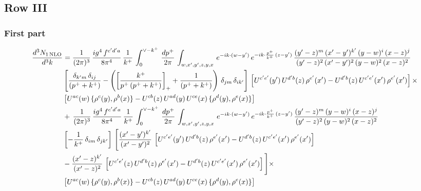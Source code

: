 \documentclass[9pt]{article}
\numberwithin{equation}{section}
\begin{document}
 \subsection{Row III}
\subsubsection{First part}
\begin{align}
\frac{d^{3}N_{1\,\rm NLO}}{d^{3}k} & = \frac{1}{(2\pi)^{3}}\, \frac{ig^{4}\,f^{c'd'a}}{8\pi^{4}}\, \frac{1}{k^{+}}\,\int_{0}^{\vee - k^{+}}\,  \frac{dp^{+}}{2\pi}\, \int_{w,x',y',z,y,x}\, e^{-ik\cdot (w-y')}\, e^{-ik\cdot \frac{p^{+}}{k^{+}}\,(z-y')}\,\frac{(y'-z)^{m}\,(x'-y')^{k'}\,(y-w)^{i}\,(x-z)^{j}}{(y'-z)^{2}\,(x'-y')^{2}\,(y-w)^{2}\,(x-z)^{2}}\notag \\ & \left[\frac{\delta_{k'm}\,\delta_{ij}}{(p^{+}+k^{+})}-\left(\left[\frac{k^{+}}{p^{+}\,(p^{+}+k^{+})}\right]_{+}+\frac{1}{(p^{+}+k^{+})}\right)\,\delta_{jm}\,\delta_{ik'}\right]\, \left[U^{c'e'}(y')\,U^{d'b}(z)\,\rho^{e'}(x')-U^{d'b}(z)\,U^{c'e'}(x')\,\rho^{e'}(x')\right]\times\notag \\ & \left[U^{ac}(w)\, \{\rho^{c}(y),\rho^{b}(x)\}-U^{cb}(z)\,U^{ad}(y)\,U^{ce}(x)\,\{\rho^{d}(y),\rho^{e}(x)\}\right] \notag \\
&  +\,\frac{1}{(2\pi)^{3}}\, \frac{ig^{4}\,f^{c'd'a}}{8\pi^{4}}\, \frac{1}{k^{+}}\,\int_{0}^{\vee - k^{+}}\,  \frac{dp^{+}}{2\pi}\, \int_{w,x',y',z,y,x}\, e^{-ik\cdot (w-y')}\, e^{-ik\cdot \frac{p^{+}}{k^{+}}\,(z-y')}\,\frac{(y'-z)^{m}\,(y-w)^{i}\,(x-z)^{j}}{(y'-z)^{2}\,(y-w)^{2}\,(x-z)^{2}}\notag \\ & \left[-\frac{1}{k^{+}}\, \delta_{im}\, \delta_{jk'}\right]\, \Bigg[\frac{(x'-y')^{k'}}{(x'-y')^{2}}\,\left[U^{c'e'}(y')\,U^{d'b}(z)\,\rho^{e'}(x')-U^{d'b}(z)\,U^{c'e'}(x')\,\rho^{e'}(x')\right]\notag \\ & -\frac{(x'-z)^{k'}}{(x'-z)^{2}}\,\left[U^{c'e'}(z)\,U^{d'b}(z)\,\rho^{e'}(x')-U^{d'b}(z)\,U^{c'e'}(x')\,\rho^{e'}(x')\right]\Bigg]\times\notag \\ &   \left[U^{ac}(w)\, \{\rho^{c}(y),\rho^{b}(x)\}-U^{cb}(z)\,U^{ad}(y)\,U^{ce}(x)\,\{\rho^{d}(y),\rho^{e}(x)\}\right]
\end{align}
\end{document}
